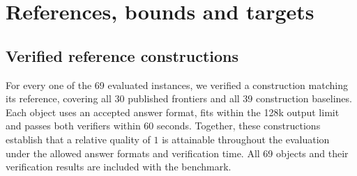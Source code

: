 \appendixpage
\section{References, bounds and targets}
\label{app:lit}
\subsection{Verified reference constructions}
\label{app:reference_witnesses}
For every one of the 69 evaluated instances, we verified a construction matching its reference, covering all 30 published frontiers and all 39 construction baselines. Each object uses an accepted answer format, fits within the 128k output limit and passes both verifiers within 60 seconds. Together, these constructions establish that a relative quality of $1$ is attainable throughout the evaluation under the allowed answer formats and verification time. All 69 objects and their verification results are included with the benchmark.

